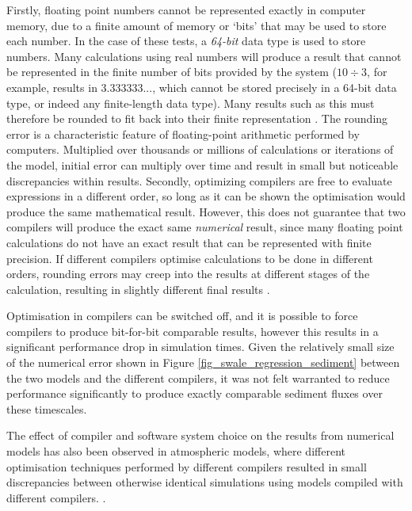 Firstly, floating point numbers cannot be represented exactly in computer memory, due to a finite amount of memory or `bits' that may be used to store each number. In the case of these tests, a \textit{64-bit} data type is used to store numbers. Many calculations using real numbers will produce a result that cannot be represented in the finite number of bits provided by the system ($10 \div 3$, for example, results in 3.333333..., which cannot be stored precisely in a 64-bit data type, or indeed any finite-length data type). Many results such as this must therefore be rounded to fit back into their finite representation \citep{goldberg1991every}. The rounding error is a characteristic feature of floating-point arithmetic performed by computers. Multiplied over thousands or millions of calculations or iterations of the model, initial error can multiply over time and result in small but noticeable discrepancies within results. 
Secondly, optimizing compilers are free to evaluate expressions in a different order, so long as it can be shown the optimisation would produce the same mathematical result. However, this does not guarantee that two compilers will produce the exact same \textit{numerical} result, since many floating point calculations do not have an exact result that can be represented with finite precision. If different compilers optimise calculations to be done in different orders, rounding errors may creep into the results at different stages of the calculation, resulting in slightly different final results \citep{goldberg1991every,monniaux2008pitfalls}.

Optimisation in compilers can be switched off, and it is possible to force compilers to produce bit-for-bit comparable results, however this results in a significant performance drop in simulation times. Given the relatively small size of the numerical error shown in Figure \ref{fig_swale_regression_sediment} between the two models and the different compilers, it was not felt warranted to reduce performance significantly to produce exactly comparable sediment fluxes over these timescales.

The effect of compiler and software system choice on the results from numerical models has also been observed in atmospheric models, where different optimisation techniques performed by different compilers resulted in small discrepancies between otherwise identical simulations using models compiled with different compilers. \citep{hong2013evaluation}. 

